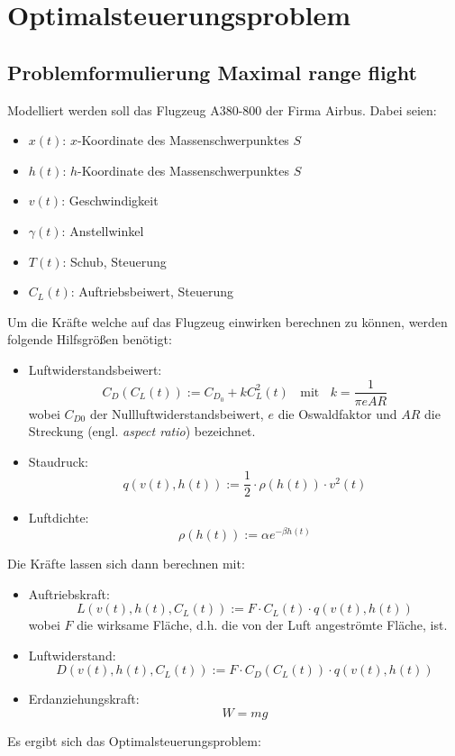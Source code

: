 \chapter{Optimalsteuerungsproblem}

\section{Problemformulierung \glqq Maximal range flight\grqq{}}
Modelliert werden soll das Flugzeug A380-800 der Firma Airbus. Dabei seien:
\begin{itemize}
\item $x(t)$: $x$-Koordinate des Massenschwerpunktes $S$
%
\item $h(t)$: $h$-Koordinate des Massenschwerpunktes $S$
%
\item $v(t)$: Geschwindigkeit
%
\item $\gamma(t)$: Anstellwinkel
%
\item $T(t)$: Schub, Steuerung
%
\item $C_L(t)$: Auftriebsbeiwert, Steuerung
\end{itemize}
Um die Kräfte welche auf das Flugzeug einwirken berechnen zu können, werden folgende Hilfsgrößen benötigt:
\begin{itemize}
\item Luftwiderstandsbeiwert: \[C_D(C_L(t)) := C_{D_0} + k C^2_L(t) \ \ \ \ \text{mit} \ \ \ \ k = \dfrac{1}{\pi e AR}\] wobei $C_{D0}$ der Nullluftwiderstandsbeiwert, $e$ die Oswaldfaktor und $AR$ die Streckung (engl. \textit{aspect ratio}) bezeichnet.
%
\item Staudruck: \[q(v(t), h(t)) := \dfrac{1}{2} \cdot \rho(h(t)) \cdot v^2(t)\]
%
\item Luftdichte: \[\rho(h(t)) := \alpha e^{-\beta h(t)}\] %
\end{itemize}
Die Kräfte lassen sich dann berechnen mit:
\begin{itemize}
\item Auftriebskraft: \[L(v(t), h(t), C_L(t)) := F \cdot C_L(t) \cdot q(v(t), h(t))\] wobei $F$ die wirksame Fläche, d.h. die von der Luft angeströmte Fläche, ist.
%
\item Luftwiderstand: \[D(v(t), h(t), C_L(t)) := F \cdot C_D(C_L(t)) \cdot q(v(t), h(t))\]
\item Erdanziehungskraft: \[W = mg\]
\end{itemize}
Es ergibt sich das Optimalsteuerungsproblem:
